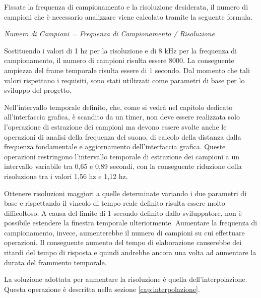 \begin{comment}
Aumentare la precisione richiede l'elaborazione di un maggior numero di campioni per ciascun frammento temporale. 
Ci sono due modi per ottenere tale effetto: aumentare la frequenza di campionamento oppure aumentare la finestra temporale.
In entrambi i casi, aumentare la precisione dell'analisi è in contrasto con il requisito di tempo reale.
Risulta necessario quindi effettuare una mediazione tra i due requisiti.
\end{comment}

Fissate la frequenza di campionamento e la risoluzione desiderata, il numero di campioni che è necessario analizzare viene calcolato tramite la seguente formula.

\vspace{0.2cm}
\centerline{\textit{Numero di Campioni = Frequenza di Campionamento / Risoluzione}}
\vspace{0.2cm}

Sostituendo i valori di 1 hz per la risoluzione e di 8 kHz per la frequenza di campionamento, il numero di campioni risulta essere 8000. 
La conseguente ampiezza del frame temporale risulta essere di 1 secondo.
Dal momento che tali valori rispettano i requisiti, sono stati utilizzati come parametri di base per lo sviluppo del progetto.

Nell'intervallo temporale definito, che, come si vedrà nel capitolo dedicato all'interfaccia grafica, è scandito da un timer, non deve essere realizzata solo l'operazione di estrazione dei campioni ma devono essere svolte anche le operazioni di analisi della frequenza del suono, di calcolo della distanza dalla frequenza fondamentale e aggiornamento dell'interfaccia grafica. 
Queste operazioni restringono l'intervallo temporale di estrazione dei campioni a un intervallo variabile tra 0,65 e 0,89 secondi, con la conseguente riduzione della risoluzione tra i valori 1,56 hz e 1,12 hz.

Ottenere risoluzioni maggiori a quelle determinate variando i due parametri di base e rispettando il vincolo di tempo reale definito risulta essere molto difficoltoso. 
A causa del limite di 1 secondo definito dallo sviluppatore, non è possibile estendere la finestra temporale ulteriormente.
Aumentare la frequenza di campionamento, invece, aumenterebbe il numero di campioni su cui effettuare operazioni. 
Il conseguente aumento del tempo di elaborazione causerebbe dei ritardi del tempo di risposta e quindi andrebbe ancora una volta ad aumentare la durata del frammento temporale.

La soluzione adottata per aumentare la risoluzione è quella dell'interpolazione.
Questa operazione è descritta nella sezione \ref{cap:interpolazione}.

